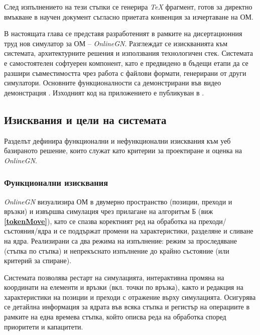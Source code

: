 След изпълнението на тези стъпки се генерира \textit{TeX} фрагмент, готов за директно вмъкване в научен документ съгласно приетата конвенция за изчертаване на ОМ.


\hspace*{2.5em}В настоящата глава се представя разработеният в рамките на дисертационния труд нов симулатор за ОМ -- \textit{OnlineGN}. Разглеждат се изискванията към системата, архитектурните решения и използвания технологичен стек. Системата е самостоятелен софтуерен компонент, като е предвидено в бъдещи етапи да се разшири съвместимостта чрез работа с файлови формати, генерирани от други симулатори. Основните функционалности са демонстрирани във видео демонстрация \cite{DIS-OnlineGN-video}. Изходният код на приложението е публикуван в \cite{phdThesisOnlineGNRepo}.

\subsection{Изисквания и цели на системата}

\hspace*{2.5em}Разделът дефинира функционални и нефункционални изисквания към уеб базираното решение, които служат като критерии за проектиране и оценка на \textit{OnlineGN}.

\subsubsection{Функционални изисквания}
\hspace*{2.5em}\textit{OnlineGN} визуализира ОМ в двумерно пространство (позиции, преходи и връзки) и извършва симулация чрез прилагане на алгоритъм Б (виж \textbf{\ref{tokenMove}}), като се спазва коректният ред на обработка на преходи/състояния/ядра и се поддържат промени на характеристики, разделяне и сливане на ядра. Реализирани са два режима на изпълнение: режим за проследяване (стъпка по стъпка) и непрекъснато изпълнение до крайно състояние (или критерий за спиране).

Системата позволява рестарт на симулацията, интерактивна промяна на координати на елементи и връзки (вкл. точки по връзка), както и редакция на характеристики на позиции и преходи с отражение върху симулацията. Осигурява се детайлна информация за ядрата във всяка стъпка и регистър на операциите в рамките на една времева стъпка, който описва реда на обработка според приоритети и капацитети.

